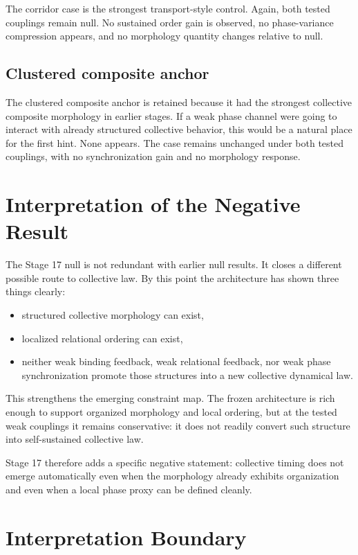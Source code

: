 \documentclass[11pt]{article}
\begin{document}
The corridor case is the strongest transport-style control. Again, both tested couplings remain null. No sustained order gain is observed, no phase-variance compression appears, and no morphology quantity changes relative to null.

\subsection{Clustered composite anchor}

The clustered composite anchor is retained because it had the strongest collective composite morphology in earlier stages. If a weak phase channel were going to interact with already structured collective behavior, this would be a natural place for the first hint. None appears. The case remains unchanged under both tested couplings, with no synchronization gain and no morphology response.

\section{Interpretation of the Negative Result}

The Stage 17 null is not redundant with earlier null results. It closes a different possible route to collective law. By this point the architecture has shown three things clearly:
\begin{itemize}
\item structured collective morphology can exist,
\item localized relational ordering can exist,
\item neither weak binding feedback, weak relational feedback, nor weak phase synchronization promote those structures into a new collective dynamical law.
\end{itemize}

This strengthens the emerging constraint map. The frozen architecture is rich enough to support organized morphology and local ordering, but at the tested weak couplings it remains conservative: it does not readily convert such structure into self-sustained collective law.

Stage 17 therefore adds a specific negative statement: collective timing does not emerge automatically even when the morphology already exhibits organization and even when a local phase proxy can be defined cleanly.

\section{Interpretation Boundary}
\end{document}
